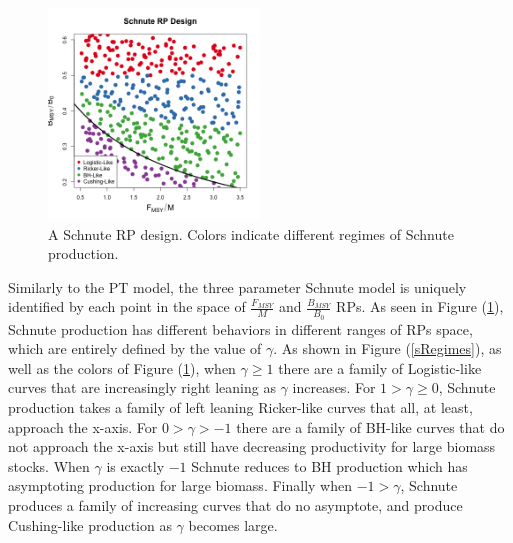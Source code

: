 \documentclass[12pt]{article}
\begin{document}

%
\begin{figure}
\vspace{-0.5cm}
\includegraphics[width=0.5\textwidth]{../gpBias/designLineColorHHardFlatT30N150WWideN112.png}
\vspace{-1cm}
\caption{
A Schnute RP design. %
Colors indicate different regimes of Schnute production. %
}
\label{colorDes}
\end{figure}

%
Similarly to the PT model, the three parameter Schnute model is uniquely 
identified by each point in the space of $\frac{F_{MSY}}{M}$ 
and $\frac{B_{MSY}}{B_0}$ RPs. As seen in Figure (\ref{colorDes}), Schnute 
production has different behaviors in different ranges of RPs space, which 
are entirely defined by the value of $\gamma$. As shown in Figure (\ref{sRegimes}), 
as well as the colors of Figure (\ref{colorDes}), when $\gamma\ge1$ there are a family 
of Logistic-like curves that are increasingly right leaning as $\gamma$ increases. 
For $1>\gamma\ge0$, Schnute production takes a family of left leaning Ricker-like curves 
that all, at least, approach the x-axis. For $0>\gamma>-1$ there are a family of BH-like 
curves that do not approach the x-axis but still have decreasing productivity for large
biomass stocks. When $\gamma$ is exactly $-1$ Schnute reduces to BH production which has 
asymptoting production for large biomass. Finally when $-1>\gamma$, Schnute 
produces a family of increasing curves that do no asymptote, and produce 
Cushing-like production as $\gamma$ becomes large.
\end{document}
